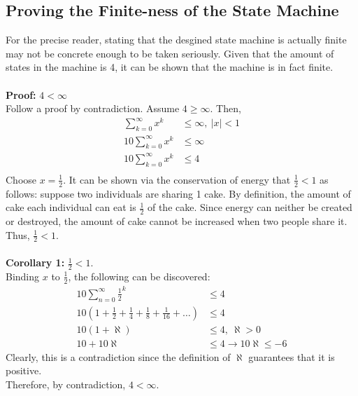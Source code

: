 \documentclass[12pt]{report}
\begin{document}
\begin{appendix}
	\chapter{Proving the Finite-ness of the State Machine}
	For the precise reader, stating that the desgined state machine is actually finite may not be
	concrete enough to be taken seriously. Given that the amount of states in the machine is 4, it
	can be shown that the machine is in fact finite.\\\\
	\textbf{Proof:} $4 < \infty$\\
	\label{a:proof}
	Follow a proof by contradiction.
	Assume $4 \geq \infty$. Then, 
	\begin{equation*}
		\begin{aligned}
			\sum_{k=0}^{\infty}x^k &\leq \infty, \ |x| < 1\\
			10\sum_{k=0}^{\infty}x^k &\leq \infty\\
			10\sum_{k=0}^{\infty}x^k &\leq 4\\
		\end{aligned}
	\end{equation*}
	Choose $x = \frac{1}{2}$. It can be shown via the conservation of energy that $\frac{1}{2} < 1$ as follows:
	suppose two individuals are sharing 1 cake. By definition, the amount of cake each individual
	can eat is $\frac{1}{2}$ of the cake. Since energy can neither be created or destroyed, the
	amount of cake cannot be increased when two people share it. Thus, $\frac{1}{2} < 1$.\\\\
	\textbf{Corollary 1:} $\frac{1}{2} < 1$. \\
	Binding $x$ to $\frac{1}{2}$, the following can be discovered:
	\begin{equation*}
		\begin{aligned}
			10\sum_{n=0}^{\infty}\frac{1}{2}^k &\leq 4\\
			10\left(1 + \frac{1}{2} +\frac{1}{4} + \frac{1}{8} + \frac{1}{16} + \dots\right) &\leq 4\\
			10\left(1 + \aleph\right) &\leq 4, \ \aleph > 0\\
			10 + 10\aleph &\leq 4 \rightarrow 10\aleph \leq -6
		\end{aligned}
	\end{equation*}
	Clearly, this is a contradiction since the definition of $\aleph$ guarantees that it is
	positive.\\
	Therefore, by contradiction, $4 < \infty$.

\end{appendix}
\end{document}

